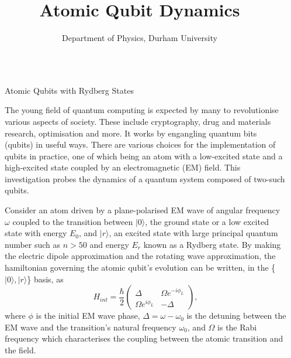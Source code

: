 \documentclass[final]{beamer}
\title{Atomic Qubit Dynamics}
\author{Department of Physics, Durham University}
\institute[shortinst]{Atomic qubits are frequently used in quantum computation. This investigation explores their dynamics.}
\newlength{\sepwidth}
\newlength{\colwidth}
\newcommand{\separatorcolumn}{\begin{column}{\sepwidth}\end{column}}
\begin{document}
\begin{frame}[t]
\begin{columns}[t]
\separatorcolumn

\begin{column}{\colwidth}

  \begin{block}{Atomic Qubits with Rydberg States}

    The young field of quantum computing is expected by many to revolutionise various aspects of society. These include
    cryptography, drug and materials research, optimisation and more. It works by engangling quantum bits (qubits)
    in useful ways. There are various choices for the implementation of qubits in practice, one of which being an atom with a
    low-excited state
    and a high-excited state coupled by an electromagnetic (EM) field. This investigation probes the dynamics of a quantum system
    composed of two-such qubits.

    Consider an atom driven by a plane-polarised EM wave of angular frequency $\omega$ coupled to the transition between
     $|0\rangle$, the ground state
    or a low excited state with energy $E_0$, and $|r\rangle$, an excited state with large principal quantum number such as $n>50$
    and energy $E_r$ known as a
    Rydberg state. By making the electric dipole approximation and the rotating wave approximation, the hamiltonian governing
    the atomic qubit's evolution can be written, in
    the \{$|0\rangle, |r\rangle$\} basis,
    as
    $$H_{int}=\frac{\hbar}{2}
    \begin{pmatrix}
      \Delta & \Omega e^{-i \phi_L} \\
      \Omega e^{i \phi_L} & -\Delta
    \end{pmatrix},
    $$
    where $\phi$ is the initial EM wave phase, $\Delta=\omega - \omega_0$ is the detuning between the EM wave and the
    transition's natural frequency $\omega_0$, and $\Omega$
    is the Rabi frequency which characterises the coupling between the atomic transition and the field.


\end{block}
\end{column}
\end{columns}
\end{frame}
\end{document}
